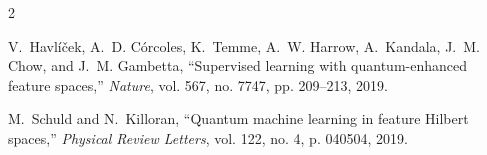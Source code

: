 \documentclass[12pt,a4paper]{article}
\begin{document}
\begin{thebibliography}{2}

V.~Havl{\'i}{\v{c}}ek, A.~D. C{\'o}rcoles, K.~Temme, A.~W. Harrow, A.~Kandala, J.~M. Chow, and J.~M. Gambetta,
``Supervised learning with quantum-enhanced feature spaces,''
\emph{Nature}, vol. 567, no. 7747, pp. 209--213, 2019.

M.~Schuld and N.~Killoran,
``Quantum machine learning in feature Hilbert spaces,''
\emph{Physical Review Letters}, vol. 122, no. 4, p. 040504, 2019.

\end{thebibliography}
\end{document}

